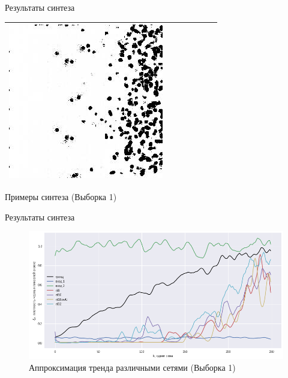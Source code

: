 \documentclass[12pt]{beamer}
\begin{document}
\begin{frame}{Результаты синтеза}
\begin{table}
\begin{center}
\begin{tabular}{p{1.2cm} p{1.2cm} p{1.2cm} p{1.2cm} p{1.2cm} p{1.2cm} p{1.2cm}}
					\includegraphics[width=1\linewidth]{8-results/sand-trend2/nf32/gen3}
					\\
					\hline
				\end{tabular}
				\vfill
				Примеры синтеза (Выборка 1)
			\end{center}
		\end{table}
	\end{frame}
	
	\begin{frame}{Результаты синтеза}
		\begin{figure}
			\includegraphics[width=\linewidth]{8-results/sand-trend2/results_cr}
			\vfill
			Аппроксимация тренда различными сетями (Выборка 1)
		\end{figure}
	\end{frame}
	
\end{document}
